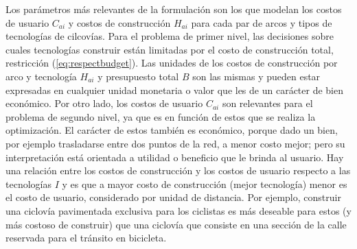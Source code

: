 Los parámetros más relevantes de la formulación son los que modelan los costos de usuario $C_{ai}$ y costos de construcción $H_{ai}$ para cada par de arcos y tipos de tecnologías de cilcovías. Para el problema de primer nivel, las decisiones sobre cuales tecnologías construir están limitadas por el costo de construcción total, restricción (\ref{eq:respectbudget}). Las unidades de los costos de construcción por arco y tecnología $H_{ai}$ y presupuesto total $B$ son las mismas y pueden estar expresadas en cualquier unidad monetaria o valor que les de un carácter de bien económico. Por otro lado, los costos de usuario $C_{ai}$ son relevantes para el problema de segundo nivel, ya que es en función de estos que se realiza la optimización. El carácter de estos también es económico, porque dado un bien, por ejemplo trasladarse entre dos puntos de la red, a menor costo mejor; pero su interpretación está orientada a utilidad o beneficio que le brinda al usuario. Hay una relación entre los costos de construcción y los costos de usuario respecto a las tecnologías $I$ y es que a mayor costo de construcción (mejor tecnología) menor es el costo de usuario, considerado por unidad de distancia. Por ejemplo, construir una ciclovía pavimentada exclusiva para los ciclistas es más deseable para estos (y más costoso de construir) que una ciclovía que consiste en una sección de la calle reservada para el tránsito en bicicleta.


